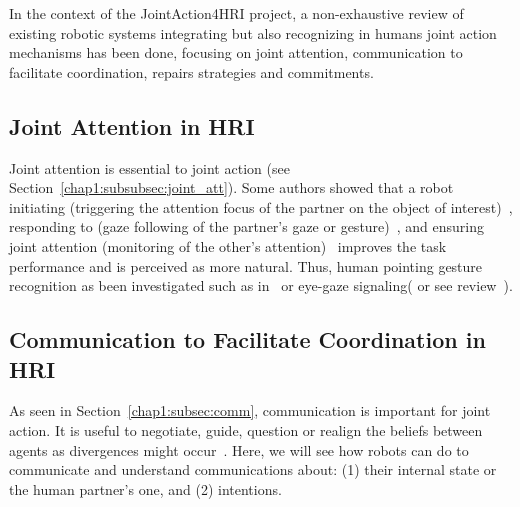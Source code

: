 \documentclass[a4paper,11pt,twoside]{StyleThese}
\begin{document}
In the context of the JointAction4HRI project, a non-exhaustive review of existing robotic systems integrating but also recognizing in humans joint action mechanisms has been done, focusing on joint attention, communication to facilitate coordination, repairs strategies and commitments.

\subsection{Joint Attention in HRI}
Joint attention is essential to joint action (see Section~\ref{chap1:subsubsec:joint_att}). Some authors showed that a robot initiating (\ie triggering the attention focus of the partner on the object of interest)~\cite{imai_2003_physical}, responding to (\ie gaze following of the partner's gaze or gesture)~\cite{yu_2010_investigating}, and ensuring joint attention (\ie monitoring of the other's attention)~\cite{huang_2010_joint} improves the task performance and is perceived as more natural. Thus, human pointing gesture recognition as been investigated such as in~\cite{nickel_2007_visual} or eye-gaze signaling(\eg \cite{staudte_2009_visual} or see review~\cite{admoni_2017_social}).

\subsection{Communication to Facilitate Coordination in HRI}

As seen in Section~\ref{chap1:subsec:comm}, communication is important for joint action. It is useful to negotiate, guide, question or realign the beliefs between agents as divergences might occur~\cite{cohen_1991_teamwork}. Here, we will see how robots can do to communicate and understand communications about: (1)  their internal state or the human partner's one, and (2) intentions.
\end{document}
